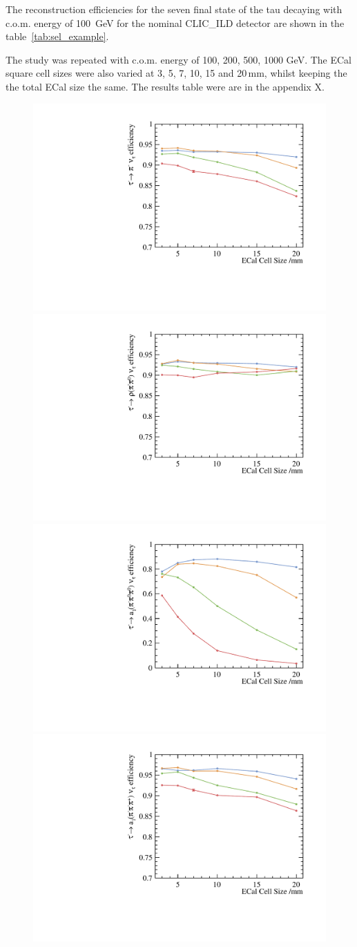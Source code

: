 \documentclass[a4paper,11pt]{article}
\begin{document}
The reconstruction efficiencies for the seven final state of the tau decaying with c.o.m. energy of 100 \,GeV for the nominal CLIC\_ILD detector are shown in the table~\ref{tab:sel_example}.

The study was repeated with c.o.m. energy of 100, 200, 500, 1000 GeV. The ECal square cell sizes were also varied at 3, 5, 7, 10, 15 and 20\,mm, whilst keeping the the total ECal size the same. The results table were are in the appendix X. 

\begin{figure}[htbp]
\centering %
\includegraphics[width=.45\textwidth]{plots/decayMode2}
\qquad
\includegraphics[width=.45\textwidth]{plots/decayMode3} 
\qquad
\includegraphics[width=.45\textwidth]{plots/decayMode4} 
\qquad
\includegraphics[width=.45\textwidth]{plots/decayMode5}

\end{figure}
\end{document}
